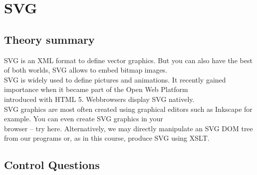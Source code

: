 \chapter{SVG}
\section{Theory summary}
SVG is an XML format to define vector graphics. But you can also have the best of both worlds, SVG allows to embed bitmap images.\\
SVG is widely used to define pictures and animations. It recently gained importance when it became part of the Open Web Platform\\
introduced with HTML 5.
Webbrowsers display SVG natively.\\
SVG graphics are most often created using graphical editors such as Inkscape for example. You can even create SVG graphics in your\\
browser – try here.
Alternatively, we may directly manipulate an SVG DOM tree from our programs or, as in this course, produce SVG using XSLT.\\
\section{Control Questions}

